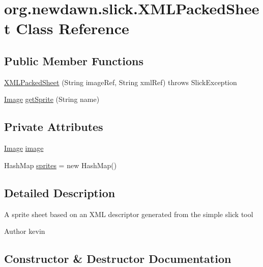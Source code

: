 \hypertarget{classorg_1_1newdawn_1_1slick_1_1_x_m_l_packed_sheet}{}\section{org.\+newdawn.\+slick.\+X\+M\+L\+Packed\+Sheet Class Reference}
\label{classorg_1_1newdawn_1_1slick_1_1_x_m_l_packed_sheet}
\subsection*{Public Member Functions}
\begin{DoxyCompactItemize}
\item 
\mbox{\hyperlink{classorg_1_1newdawn_1_1slick_1_1_x_m_l_packed_sheet_a6bc2189b9444756a6287ea971796a910}{X\+M\+L\+Packed\+Sheet}} (String image\+Ref, String xml\+Ref)  throws Slick\+Exception 	
\item 
\mbox{\hyperlink{classorg_1_1newdawn_1_1slick_1_1_image}{Image}} \mbox{\hyperlink{classorg_1_1newdawn_1_1slick_1_1_x_m_l_packed_sheet_a4d32457f7a969d9e97965017e878858b}{get\+Sprite}} (String name)
\end{DoxyCompactItemize}
\subsection*{Private Attributes}
\begin{DoxyCompactItemize}
\item 
\mbox{\hyperlink{classorg_1_1newdawn_1_1slick_1_1_image}{Image}} \mbox{\hyperlink{classorg_1_1newdawn_1_1slick_1_1_x_m_l_packed_sheet_a8f418205fde15e4b3e64b363b74a7fae}{image}}
\item 
Hash\+Map \mbox{\hyperlink{classorg_1_1newdawn_1_1slick_1_1_x_m_l_packed_sheet_a4afb6e9a66274013a24e53f4f01864bb}{sprites}} = new Hash\+Map()
\end{DoxyCompactItemize}


\subsection{Detailed Description}
A sprite sheet based on an X\+ML descriptor generated from the simple slick tool

\begin{DoxyAuthor}{Author}
kevin 
\end{DoxyAuthor}


\subsection{Constructor \& Destructor Documentation}
\mbox{\label{classorg_1_1newdawn_1_1slick_1_1_x_m_l_packed_sheet_a6bc2189b9444756a6287ea971796a910}} 
